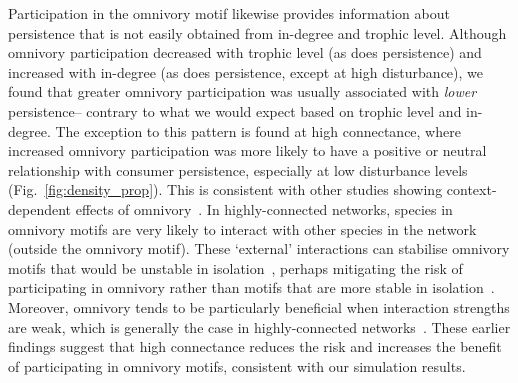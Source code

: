 \documentclass[12pt]{article}
\begin{document}
\begin{spacing}{2.0}
    Participation in the omnivory motif likewise provides information about persistence that is not easily obtained from in-degree and trophic level.
    Although omnivory participation decreased with trophic level (as does persistence) and increased with in-degree (as does persistence, except at high disturbance), we found that greater omnivory participation was usually associated with \emph{lower} persistence-- contrary to what we would expect based on trophic level and in-degree.
    The exception to this pattern is found at high connectance, where increased omnivory participation was more likely to have a positive or neutral relationship with consumer persistence, especially at low disturbance levels (Fig.~\ref{fig:density_prop}).
    This is consistent with other studies showing context-dependent effects of omnivory~\citep{Bascompte2005,Monteiro2016}.
    In highly-connected networks, species in omnivory motifs are very likely to interact with other species in the network (outside the omnivory motif).
    These `external' interactions can stabilise omnivory motifs that would be unstable in isolation~\citep{Kratina2012}, perhaps mitigating the risk of participating in omnivory rather than motifs that are more stable in isolation~\citep{Borrelli2015a}.
    Moreover, omnivory tends to be particularly beneficial when interaction strengths are weak, which is generally the case in highly-connected networks~\citep{Emmerson2004}.
    These earlier findings suggest that high connectance reduces the risk and increases the benefit of participating in omnivory motifs, consistent with our simulation results.
    


\end{spacing}
\end{document}
